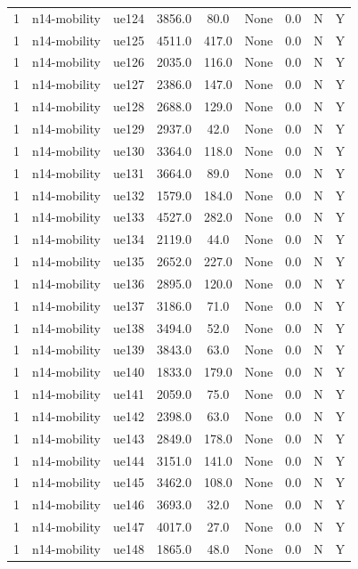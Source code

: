 \begin{table}[ht]
\begin{tabular}{|c|c|c|c|c|c|c|c|c|}
1 & n14-mobility & ue124 & 3856.0 & 80.0 & None & 0.0 & N & Y \\
1 & n14-mobility & ue125 & 4511.0 & 417.0 & None & 0.0 & N & Y \\
1 & n14-mobility & ue126 & 2035.0 & 116.0 & None & 0.0 & N & Y \\
1 & n14-mobility & ue127 & 2386.0 & 147.0 & None & 0.0 & N & Y \\
1 & n14-mobility & ue128 & 2688.0 & 129.0 & None & 0.0 & N & Y \\
1 & n14-mobility & ue129 & 2937.0 & 42.0 & None & 0.0 & N & Y \\
1 & n14-mobility & ue130 & 3364.0 & 118.0 & None & 0.0 & N & Y \\
1 & n14-mobility & ue131 & 3664.0 & 89.0 & None & 0.0 & N & Y \\
1 & n14-mobility & ue132 & 1579.0 & 184.0 & None & 0.0 & N & Y \\
1 & n14-mobility & ue133 & 4527.0 & 282.0 & None & 0.0 & N & Y \\
1 & n14-mobility & ue134 & 2119.0 & 44.0 & None & 0.0 & N & Y \\
1 & n14-mobility & ue135 & 2652.0 & 227.0 & None & 0.0 & N & Y \\
1 & n14-mobility & ue136 & 2895.0 & 120.0 & None & 0.0 & N & Y \\
1 & n14-mobility & ue137 & 3186.0 & 71.0 & None & 0.0 & N & Y \\
1 & n14-mobility & ue138 & 3494.0 & 52.0 & None & 0.0 & N & Y \\
1 & n14-mobility & ue139 & 3843.0 & 63.0 & None & 0.0 & N & Y \\
1 & n14-mobility & ue140 & 1833.0 & 179.0 & None & 0.0 & N & Y \\
1 & n14-mobility & ue141 & 2059.0 & 75.0 & None & 0.0 & N & Y \\
1 & n14-mobility & ue142 & 2398.0 & 63.0 & None & 0.0 & N & Y \\
1 & n14-mobility & ue143 & 2849.0 & 178.0 & None & 0.0 & N & Y \\
1 & n14-mobility & ue144 & 3151.0 & 141.0 & None & 0.0 & N & Y \\
1 & n14-mobility & ue145 & 3462.0 & 108.0 & None & 0.0 & N & Y \\
1 & n14-mobility & ue146 & 3693.0 & 32.0 & None & 0.0 & N & Y \\
1 & n14-mobility & ue147 & 4017.0 & 27.0 & None & 0.0 & N & Y \\
1 & n14-mobility & ue148 & 1865.0 & 48.0 & None & 0.0 & N & Y \\

\end{tabular}
\end{table}
